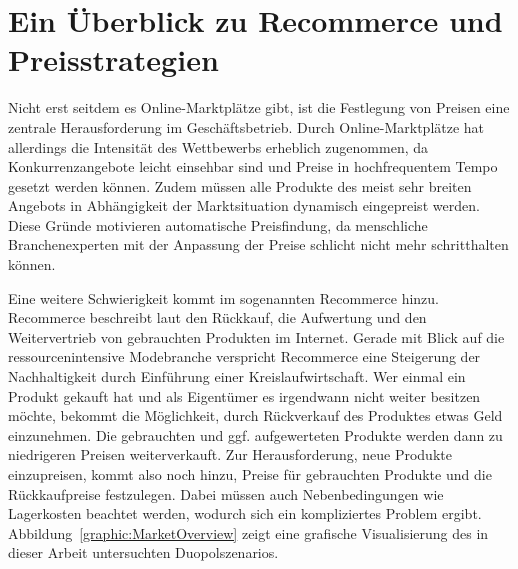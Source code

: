 \section{Ein Überblick zu Recommerce und Preisstrategien}
Nicht erst seitdem es Online-Marktplätze gibt, ist die Festlegung von Preisen eine zentrale Herausforderung im Geschäftsbetrieb.
Durch Online-Marktplätze hat allerdings die Intensität des Wettbewerbs erheblich zugenommen, da Konkurrenzangebote leicht einsehbar sind und Preise in hochfrequentem Tempo gesetzt werden können.
Zudem müssen alle Produkte des meist sehr breiten Angebots in Abhängigkeit der Marktsituation dynamisch eingepreist werden.
Diese Gründe motivieren automatische Preisfindung, da menschliche Branchenexperten mit der Anpassung der Preise schlicht nicht mehr schritthalten können.

Eine weitere Schwierigkeit kommt im sogenannten Recommerce hinzu.
Recommerce beschreibt laut \cite{RecommerceDefinition} den Rückkauf, die Aufwertung und den Weitervertrieb von gebrauchten Produkten im Internet.
Gerade mit Blick auf die ressourcenintensive Modebranche verspricht Recommerce eine Steigerung der Nachhaltigkeit durch Einführung einer Kreislaufwirtschaft.
Wer einmal ein Produkt gekauft hat und als Eigentümer es irgendwann nicht weiter besitzen möchte, bekommt die Möglichkeit, durch Rückverkauf des Produktes etwas Geld einzunehmen.
Die gebrauchten und ggf. aufgewerteten Produkte werden dann zu niedrigeren Preisen weiterverkauft.
Zur Herausforderung, neue Produkte einzupreisen, kommt also noch hinzu, Preise für gebrauchten Produkte und die Rückkaufpreise festzulegen.
Dabei müssen auch Nebenbedingungen wie Lagerkosten beachtet werden, wodurch sich ein kompliziertes Problem ergibt.
\mbox{Abbildung \ref{graphic:MarketOverview}} zeigt eine grafische Visualisierung des in dieser Arbeit untersuchten Duopolszenarios.

